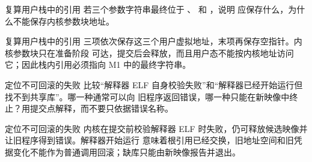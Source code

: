 \begin{chapterexercise}{复算用户栈中的引用}
若三个参数字符串最终位于 、 和
，说明  应保存什么，为什么不能保存内核参数块地址。
\end{chapterexercise}

\begin{chapteranswer}{复算用户栈中的引用}
 三项依次保存这三个用户虚拟地址，末项再保存空指针。内核参数块只在准备阶段
可达，提交后会释放，而且用户态不能按内核地址访问它；因此栈内引用必须指向 M1 中的最终字符串。
\end{chapteranswer}

\begin{chapterexercise}{定位不可回滚的失败}
比较“解释器 ELF 自身校验失败”和“解释器已经开始运行但找不到共享库”。哪一种通常可以向
旧程序返回错误，哪一种只能在新映像中终止？用提交点解释，而不要只依据错误名称。
\end{chapterexercise}

\begin{chapteranswer}{定位不可回滚的失败}
内核在提交前校验解释器 ELF 时失败，仍可释放候选映像并让旧程序得到错误。解释器开始运行
意味着根引用已经交换，旧地址空间和旧凭据变化不能作为普通调用回滚；缺库只能由新映像报告并退出。
\end{chapteranswer}
